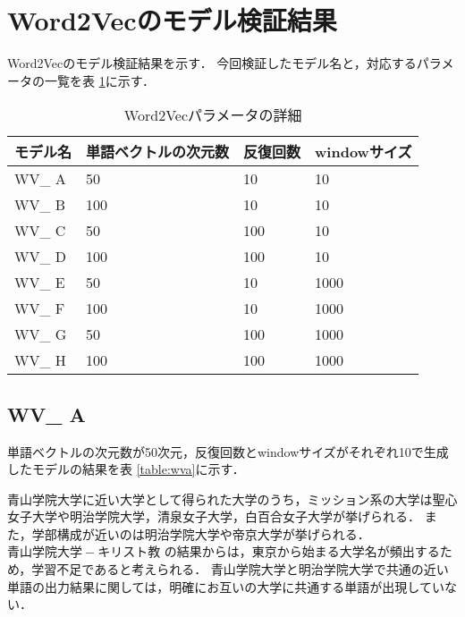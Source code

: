 \section{Word2Vecのモデル検証結果}
Word2Vecのモデル検証結果を示す．
今回検証したモデル名と，対応するパラメータの一覧を表 \ref{table:wvResultAll}に示す．

\begin{table}[H]
\caption{Word2Vecパラメータの詳細}
\centering
\begin{tabular}{llll}
\hline
モデル名 & 単語ベクトルの次元数 & 反復回数 & windowサイズ
\\ \hline \hline
WV\_ A & 50 & 10 & 10\\ \hline
WV\_ B & 100 & 10 & 10\\ \hline
WV\_ C & 50 & 100 & 10\\ \hline
WV\_ D & 100 & 100 & 10\\ \hline
WV\_ E & 50 & 10 & 1000\\ \hline
WV\_ F & 100 & 10 & 1000\\ \hline
WV\_ G & 50 & 100 & 1000\\ \hline
WV\_ H & 100 & 100 & 1000\\ \hline
\end{tabular}
\label{table:wvResultAll}
\end{table}

\subsection{WV\_ A}
単語ベクトルの次元数が50次元，反復回数とwindowサイズがそれぞれ10で生成したモデルの結果を表 \ref{table:wva}に示す．

青山学院大学に近い大学として得られた大学のうち，ミッション系の大学は聖心女子大学や明治学院大学，清泉女子大学，白百合女子大学が挙げられる．
また，学部構成が近いのは明治学院大学や帝京大学が挙げられる．
$ 青山学院大学 - キリスト教 $ の結果からは，東京から始まる大学名が頻出するため，学習不足であると考えられる．
青山学院大学と明治学院大学で共通の近い単語の出力結果に関しては，明確にお互いの大学に共通する単語が出現していない．

